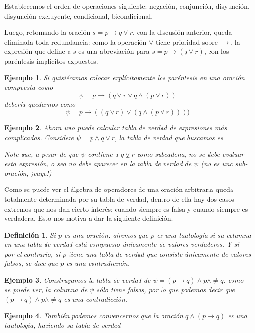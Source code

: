 \documentclass{book}
\newtheorem{df}{Definición}[chapter]
\newtheorem*{ejm}{Ejemplo}
\begin{document}
Establecemos el orden de operaciones siguiente: negación, conjunción, disyunción, disyunción excluyente, condicional, bicondicional.

Luego, retomando la oración $s=p\rightarrow q \vee r$, con la discusión anterior, queda eliminada toda redundancia: como la operación $\vee$ tiene prioridad sobre $\rightarrow$, la expresión que define a $s$ es una abreviación para $s=p\rightarrow (q \vee r)$, con los paréntesis implícitos expuestos.

\begin{ejm}
	Si quisiéramos colocar explícitamente los paréntesis en una oración compuesta como \[\psi = p \rightarrow (q \vee r \veebar q \wedge (p \vee r)) \]
	debería quedarnos como
	\[\psi = p \rightarrow ((q \vee r) \veebar (q \wedge (p \vee r)))) \]
\end{ejm}

\begin{ejm}
	Ahora uno puede calcular tabla de verdad de expresiones más complicadas. Considere $\psi = p \wedge q\veebar r$, la tabla de verdad que buscamos es %
	
	Note que, a pesar de que $\psi$ contiene a $q\veebar r$ como subcadena, no se debe evaluar esta expresión, o sea no debe aparecer en la tabla de verdad de $\psi$ (no es una sub-oración, ¡vaya!)
\end{ejm}

Como se puede ver el álgebra de operadores de una oración arbitraria queda totalmente determinada por su tabla de verdad, dentro de ella hay dos casos extremos que nos dan cierto interés: cuando siempre es falsa y cuando siempre es verdadera. Esto nos motiva a dar la siguiente definición.

\begin{df}
	Si $p$ es una oración, diremos que $p$ es una \emph{tautología} si su columna en una tabla de verdad está compuesto únicamente de valores verdaderos.
	Y si por el contrario, si $p$ tiene una tabla de verdad que consiste únicamente de valores falsos, se dice que $p$ es una contradicción.
\end{df}

\begin{ejm}
	Construyamos la tabla de verdad de $\psi = (p\rightarrow q)\wedge p \wedge \neq q$.
	como se puede ver, la columna de $\psi$ sólo tiene falsos, por lo que podemos decir que $(p\rightarrow q)\wedge p \wedge \neq q$ es una contradicción.
\end{ejm}
\begin{ejm}
	También podemos convencernos que la oración $q \wedge (p \rightarrow q)$ es una tautología, haciendo su tabla de verdad
\end{ejm}
\end{document}
